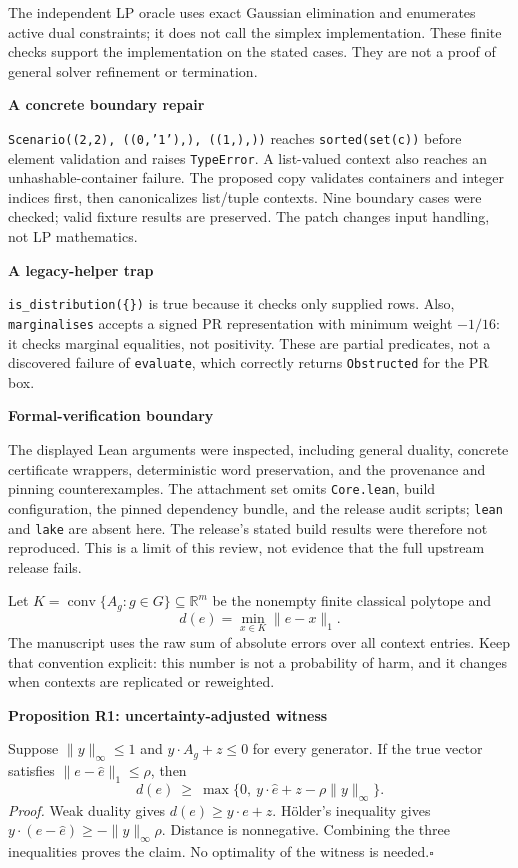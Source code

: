 \documentclass[11pt,letterpaper]{article}
\newcommand{\sect}[1]{\vspace{3pt}{\Large\sffamily\bfseries\color{ink}#1}\par\vspace{3pt}}
\newcommand{\sub}[1]{{\bfseries\color{ink}#1}\par}
\newcommand{\conv}{\operatorname{conv}}
\newcommand{\R}{\mathbb R}
\newcommand{\code}[1]{\texttt{\small #1}}
\begin{document}
The independent LP oracle uses exact Gaussian elimination and enumerates active dual constraints; it does not call the simplex implementation. These finite checks support the implementation on the stated cases. They are not a proof of general solver refinement or termination.

\sub{A concrete boundary repair}
\code{Scenario((2,2), ((0,'1'),), ((1,),))} reaches \code{sorted(set(c))} before element validation and raises \code{TypeError}. A list-valued context also reaches an unhashable-container failure. The proposed copy validates containers and integer indices first, then canonicalizes list/tuple contexts. Nine boundary cases were checked; valid fixture results are preserved. The patch changes input handling, not LP mathematics.

\sub{A legacy-helper trap}
\code{is\_distribution(\{\})} is true because it checks only supplied rows. Also, \code{marginalises} accepts a signed PR representation with minimum weight $-1/16$: it checks marginal equalities, not positivity. These are partial predicates, not a discovered failure of \code{evaluate}, which correctly returns \code{Obstructed} for the PR box.

\sub{Formal-verification boundary}
The displayed Lean arguments were inspected, including general duality, concrete certificate wrappers, deterministic word preservation, and the provenance and pinning counterexamples. The attachment set omits \code{Core.lean}, build configuration, the pinned dependency bundle, and the release audit scripts; \code{lean} and \code{lake} are absent here. The release's stated build results were therefore not reproduced. This is a limit of this review, not evidence that the full upstream release fails.

\newpage
\sect{Extension 1: contextuality with uncertain data}
Let $K=\conv\{A_g:g\in G\}\subseteq\R^m$ be the nonempty finite classical polytope and
\[
 d(e)=\min_{x\in K}\|e-x\|_1.
\]
The manuscript uses the raw sum of absolute errors over all context entries. Keep that convention explicit: this number is not a probability of harm, and it changes when contexts are replicated or reweighted.

\sub{Proposition R1: uncertainty-adjusted witness}
Suppose $\|y\|_\infty\leq1$ and $y\cdot A_g+z\leq0$ for every generator. If the true vector satisfies $\|e-\widehat e\|_1\leq\rho$, then
\[
\boxed{\quad d(e)\ \geq\ \max\{0,\ y\cdot\widehat e+z-\rho\|y\|_\infty\}.\quad}
\]
\textit{Proof.} Weak duality gives $d(e)\geq y\cdot e+z$. H\"older's inequality gives $y\cdot(e-\widehat e)\geq-\|y\|_\infty\rho$. Distance is nonnegative. Combining the three inequalities proves the claim. No optimality of the witness is needed.\hfill$\square$
\end{document}

